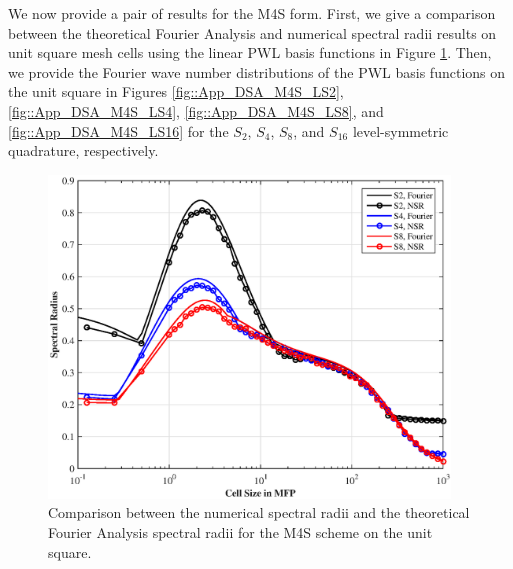 We now provide a pair of results for the M4S form. First, we give a comparison between the theoretical Fourier Analysis and numerical spectral radii results on unit square mesh cells using the linear PWL basis functions in Figure \ref{fig::App_DSA_2D_M4S_Fourier_NSR}. Then, we provide the Fourier wave number distributions of the PWL basis functions on the unit square in Figures \ref{fig::App_DSA_M4S_LS2}, \ref{fig::App_DSA_M4S_LS4}, \ref{fig::App_DSA_M4S_LS8}, and \ref{fig::App_DSA_M4S_LS16} for the $S_2$, $S_4$, $S_8$, and $S_{16}$ level-symmetric quadrature, respectively.


\begin{figure}
\centering
\includegraphics[width=0.95\textwidth]{figures/appendices/SI_M4S_2D_wNSR.eps}
\caption{Comparison between the numerical spectral radii and the theoretical Fourier Analysis spectral radii for the M4S scheme on the unit square.}
\label{fig::App_DSA_2D_M4S_Fourier_NSR}
\end{figure}

